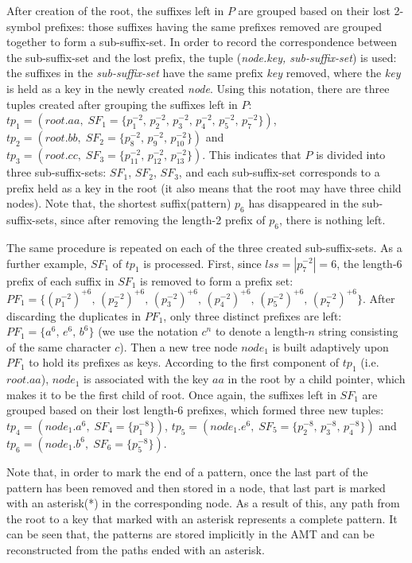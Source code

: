\documentclass{article}
\begin{document}
After creation of the root, the suffixes left in $P$ are grouped based
on their lost 2-symbol prefixes: those suffixes having the same
prefixes removed are grouped together to form a sub-suffix-set. In
order to record the correspondence between the sub-suffix-set and the
lost prefix, the tuple (\emph{node.key,\; sub-suffix-set}) is used:
the suffixes in the \emph{sub-suffix-set} have the same prefix
\emph{key} removed, where the \emph{key} is held as a key in the newly
created \emph{node}. Using this notation, there are three tuples
created after grouping the suffixes left in $P$:
$tp_1 = (root.aa,\; SF_1=\{p_1^{-2},\, p_2^{-2},\, p_3^{-2},\,
p_4^{-2},\, p_5^{-2},\, p_7^{-2}\})$,\,
$tp_2 = (root.bb,\; SF_2=\{p_8^{-2},\, p_9^{-2},\, p_{10}^{-2}\})$ and
$tp_3 = (root.cc,\; SF_3=\{p_{11}^{-2},\, p_{12}^{-2},\,
p_{13}^{-2}\})$. This indicates that $P$ is divided into three
sub-suffix-sets: $SF_1$, $SF_2$, $SF_3$, and each sub-suffix-set
corresponds to a prefix held as a key in the root (it also means that
the root may have three child nodes). Note that, the shortest
suffix(pattern) $p_6$ has disappeared in the sub-suffix-sets, since
after removing the length-2 prefix of $p_6$, there is nothing left.

The same procedure is repeated on each of the three created
sub-suffix-sets. As a further example, $SF_1$ of $tp_1$ is
processed. First, since $lss = |p_7^{-2}| = 6$, the length-$6$ prefix
of each suffix in $SF_1$ is removed to form a prefix set:
$PF_1 = \{(p_1^{-2})^{+6},\, (p_2^{-2})^{+6},\, (p_3^{-2})^{+6},\,
(p_4^{-2})^{+6},\, (p_5^{-2})^{+6},\, (p_7^{-2})^{+6}\}$. After
discarding the duplicates in $PF_1$, only three distinct prefixes are
left: $PF_1 = \{a^6,\, e^6,\, b^6\}$ (we use the notation $c^n$ to
denote a length-$n$ string consisting of the same character $c$).
Then a new tree node $node_1$ is built adaptively upon $PF_1$ to hold
its prefixes as keys.  According to the first component of $tp_1$
(i.e. $root.aa$), $node_1$ is associated with the key $aa$ in the root
by a child pointer, which makes it to be the first child of root. Once
again, the suffixes left in $SF_1$ are grouped based on their lost
length-6 prefixes, which formed three new tuples:
$tp_4 = (node_1.a^6,\; SF_4=\{p_1^{-8}\})$,
$tp_5 = (node_1.e^6,\; SF_5=\{p_2^{-8},\, p_3^{-8},\, p_4^{-8}\})$ and
$tp_6 = (node_1.b^6,\; SF_6=\{p_5^{-8}\})$.

Note that, in order to mark the end of a pattern, once the last part
of the pattern has been removed and then stored in a node, that last
part is marked with an asterisk(*) in the corresponding node. As a
result of this, any path from the root to a key that marked with an
asterisk represents a complete pattern. It can be seen that, the
patterns are stored implicitly in the AMT and can be reconstructed
from the paths ended with an asterisk.
\end{document}
